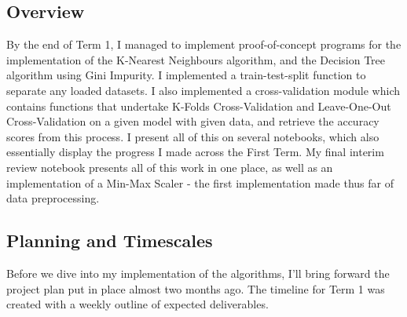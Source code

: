 \documentclass[letterpaper,10pt]{article}
\begin{document}
\subsection{Overview}
By the end of Term 1, I managed to implement proof-of-concept programs for the implementation of the K-Nearest Neighbours algorithm, and the Decision Tree algorithm using Gini Impurity. I implemented a train-test-split function to separate any loaded datasets. I also implemented a cross-validation module which contains functions that undertake K-Folds Cross-Validation and Leave-One-Out Cross-Validation on a given model with given data, and retrieve the accuracy scores from this process. I present all of this on several notebooks, which also essentially display the progress I made across the First Term. My final interim review notebook presents all of this work in one place, as well as an implementation of a Min-Max Scaler - the first implementation made thus far of data preprocessing.\par

\newpage
\subsection{Planning and Timescales}
Before we dive into my implementation of the algorithms, I'll bring forward the project plan put in place almost two months ago. The timeline for Term 1 was created with a weekly outline of expected deliverables. \par
\end{document}
